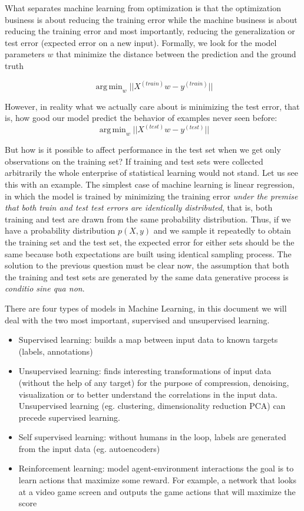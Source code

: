 \documentclass[11pt]{article}
\theoremstyle{definition}
\theoremstyle{remark}
\DeclareMathOperator*{\argmin}{arg\,min}
\begin{document}
What separates machine learning from optimization is that the optimization business is about reducing the training error while the machine business is about reducing the training error and most importantly, reducing the generalization or test error (expected error on a new input). 
Formally, we look for the model parameters $w$ that minimize the distance between the prediction and the ground truth

\begin{equation}
\argmin_{w} ||X^{(train)}w - y^{(train)}||
\label{eq:reaintest1}
\end{equation}

However, in reality what we actually care about is minimizing the test error, that is, how good our model predict the behavior of examples never seen before:
\begin{equation}
\argmin_{w} ||X^{(test)}w - y^{(test)}||
\end{equation}

But how is it possible to affect performance in the test set when we get only observations on the training set? If training and test sets were collected arbitrarily the whole enterprise of statistical learning would not stand. 
Let us see this with an example. The simplest case of machine learning is linear regression, in which the model is trained by minimizing the training error \emph{under the premise that both train and test test errors are identically distributed}, that is, both training and test are drawn from the same probability distribution. Thus, if we have a probability distribution $p(X,y)$ and we sample it repeatedly to obtain the training set and the test set, the expected error for either sets should be the same because both expectations are built using identical sampling process. The solution to the previous question must be clear now, the assumption that both the training and test sets are generated by the same data generative process is \emph{conditio sine qua non}.

There are four types of models in Machine Learning, in this document we will deal with the two most important, supervised and unsupervised learning.  
\begin{itemize}
\item Supervised learning: builds a map between input data to known targets (labels, annotations) 
\item Unsupervised learning: finds interesting transformations of input data (without the help of any target) for the purpose of compression, denoising, visualization or to better understand the correlations in the input data. Unsupervised learning (eg. clustering, dimensionality reduction PCA) can precede supervised learning.
\item Self supervised learning: without humans in the loop, labels are generated from the input data (eg. autoencoders)
\item Reinforcement learning: model agent-environment interactions the goal is to learn actions that maximize some reward. For example, a network that looks at a video game screen and outputs the game actions that will maximize the score \cite{mnih2013playing}
\end{itemize}
\end{document}
